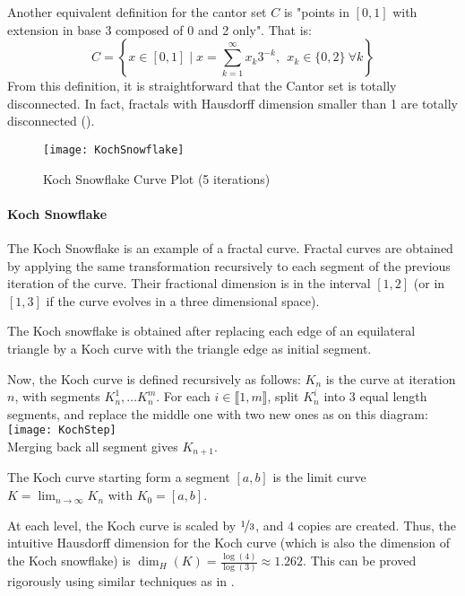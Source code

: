 Another equivalent definition for the cantor set $C$ is "points in $\left[ 0,1 \right]$ with extension in base 3 composed of 0 and 2 only".
That is:
$$
C = \left\lbrace x \in \left[ 0,1 \right] \mid x = \sum_{k=1}^{\infty} x_k 3^{-k}, \ \ x_k \in \{0,2\} \ \forall k \right\rbrace
$$
From this definition, it is straightforward that the Cantor set is totally disconnected.
In fact, fractals with Hausdorff dimension smaller than 1 are totally disconnected (\cite[p. 33, prop. 2.5]{Falconer_1990}).

\begin{wrapfigure}{r}{5cm}
	\vspace{-0.5cm}
	\texttt{[image: KochSnowflake]}
	\centering
	\captionsetup{justification=centering}
	\caption{Koch Snowflake Curve Plot (5 iterations)}
	\label{fig:KochSnowflake}
\end{wrapfigure}
\paragraph{Koch Snowflake}
The Koch Snowflake is an example of a fractal curve.
Fractal curves are obtained by applying the same transformation recursively to each segment of the previous iteration of the curve.
Their fractional dimension is in the interval $\left[ 1,2 \right]$ (or in $\left[ 1,3 \right]$ if the curve evolves in a three dimensional space).

The Koch snowflake is obtained after replacing each edge of an equilateral triangle by a Koch curve with the triangle edge as initial segment.

Now, the Koch curve is defined recursively as follows:
$K_n$ is the curve at iteration $n$, with segments $K_n^1, \dots K_n^m$.
For each $i \in \llbracket 1,m \rrbracket$, split $K_n^i$ into 3 equal length segments, and replace the middle one with two new ones as on this diagram:\vspace{0.2cm}\\
\texttt{[image: KochStep]}\vspace{0.2cm}\\
Merging back all segment gives $K_{n+1}$.

The Koch curve starting form a segment $[a,b]$ is the limit curve $K = \lim_{n \to \infty} K_n$ with $K_0 = [a,b]$.

At each level, the Koch curve is scaled by $\nicefrac{1}{3}$, and $4$ copies are created.
Thus, the intuitive Hausdorff dimension for the Koch curve (which is also the dimension of the Koch snowflake) is $\dim_H(K) = \frac{\log(4)}{\log(3)} \approx 1.262$.
This can be proved rigorously using similar techniques as in \cite[p. 34-35, ex. 2.7]{Falconer_1990}.

